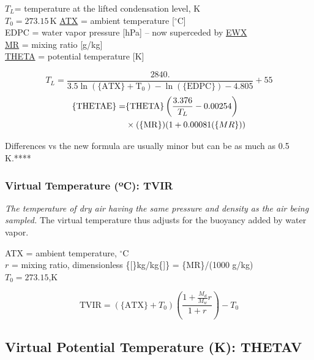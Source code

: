 \documentclass[
]{book}
\begin{document}
\(T_{L}\)= temperature at the lifted condensation level, K\\
\(T_0=273.15\,\mathrm{K}\)
\protect\hyperlink{ambient-t}{ATX} = ambient temperature {[}\(^{\circ}\mathrm{C}\){]}\\
EDPC = water vapor pressure {[}hPa{]} -- now superceded by \protect\hyperlink{ewx}{EWX}\\
\protect\hyperlink{MR}{MR} = mixing ratio {[}g/kg{]}\\
\protect\hyperlink{theta}{THETA} = potential temperature {[}K{]}

\begin{equation}
T_{L}=\frac{2840.}{3.5\ln(\mathrm{\{ATX\}+T_{0}})-\ln(\mathrm{\{EDPC\}})-4.805}+55
\label{eq:TLCL2}
\end{equation}
\begin{align}
\mathrm{\{THETAE\}} = & \mathrm{\{THETA\}}\left(\frac{3.376}{T_{L}}-0.00254\right)\notag \\
& \times (\mathrm{\{MR\}})(1+0.00081(\{MR\}))
\label{eq:THETAE}
\end{align}

Differences vs the new formula are usually minor but can be as much as 0.5 K.****

\hypertarget{TVIR}{%
\subsubsection*{\texorpdfstring{Virtual Temperature ({º}C): TVIR}{Virtual Temperature (ºC): TVIR}}\label{TVIR}}

\emph{The temperature of dry air having the same pressure and density as the air being sampled.} The virtual temperature thus adjusts for the buoyancy added by water vapor.

ATX = ambient temperature, \(^{\circ}\mathrm{C}\)\\
\(r\) = mixing ratio, dimensionless \{{[}\}kg/kg\{{]}\} = \{MR\}/(1000 g/kg)\\
\(T_{0}=273.15\),K

\begin{equation}
\mathrm{TVIR}=(\mathrm{\{ATX\}}+T_{0})\left(\frac{1+\frac{M_{d}}{M_{w}}r}{1+r}\right)-T_{0}
\label{eq:TVIR}
\end{equation}

\hypertarget{thetav}{%
\subsection*{Virtual Potential Temperature (K): THETAV}\label{thetav}}
\end{document}
